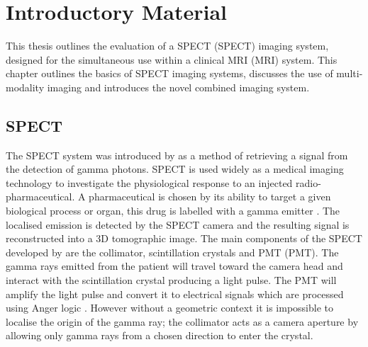 \chapter{Introductory Material}
\label{Introduction}

This thesis outlines the evaluation of a \acrlong{SPECT} (\acrshort{SPECT}) imaging system, designed for the simultaneous use within a clinical \acrlong{MRI} (\acrshort{MRI}) system. This chapter outlines the basics of \acrshort{SPECT} imaging systems, discusses the use of multi-modality imaging and introduces the novel combined imaging system. 

\section{SPECT}
The \acrshort{SPECT} system was introduced by \cite{Anger1958ScintillationCamera} as a method of retrieving a signal from the detection of gamma photons. \acrshort{SPECT} is used widely as a medical imaging technology to investigate the physiological response to an injected radio-pharmaceutical. A pharmaceutical is chosen by its ability to target a given biological process or organ, this drug is labelled with a gamma emitter \cite{Chiewitz1935Radioactive1}. The localised emission is detected by the \acrshort{SPECT} camera and the resulting signal is reconstructed into a 3D tomographic image. The main components of the \acrshort{SPECT} developed by \cite{Anger1952UseStudies} are the collimator, scintillation crystals and \acrlong{PMT} (\acrshort{PMT}). The gamma rays emitted from the patient will travel toward the camera head and interact with the scintillation crystal producing a light pulse. The \acrshort{PMT} will amplify the light pulse and convert it to electrical signals which are processed using Anger logic \cite{Peterson2011SPECTBeyond.}. However without a geometric context it is impossible to localise the origin of the gamma ray; the collimator acts as a camera aperture by allowing only gamma rays from a chosen direction to enter the crystal.
